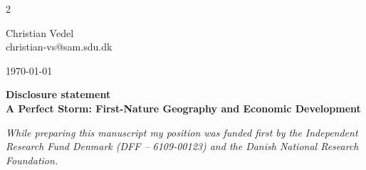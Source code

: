 \documentclass[11pt]{article}
\begin{document}
\begin{multicols}{2}
\begin{flushleft}
    \small
    Christian Vedel \\
    christian-vs@sam.sdu.dk \\
\end{flushleft}
\columnbreak
\begin{flushright}
    \small
    \today
\end{flushright}
\end{multicols}

\vspace{0.25cm}
\begin{center}
    \Large
    \textbf{Disclosure statement} \\
    \vspace{0.25cm}
    \large
    \textbf{A Perfect Storm: First-Nature Geography and Economic Development}
    
\end{center}

\vspace{1cm}
\textit{
While preparing this manuscript my position was funded first by the Independent Research Fund Denmark (DFF – 6109-00123) and the Danish National Research Foundation.
}
\end{document}

